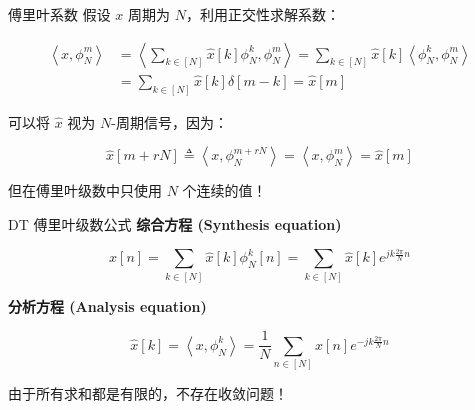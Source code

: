 \documentclass[
  ignorenonframetext,
]{beamer}
\begin{document}
\begin{frame}{傅里叶系数}
\protect{}\label{ux5085ux91ccux53f6ux7cfbux6570}
假设 \(x\) 周期为 \(N\)，利用正交性求解系数：

\[
\begin{aligned}
\left\langle x, \phi_{N}^{m}\right\rangle & =\left\langle\sum_{k \in[N]} \hat{x}[k] \phi_{N}^{k}, \phi_{N}^{m}\right\rangle=\sum_{k \in[N]} \hat{x}[k]\left\langle\phi_{N}^{k}, \phi_{N}^{m}\right\rangle \\
& =\sum_{k \in[N]} \hat{x}[k] \delta[m-k]=\hat{x}[m]
\end{aligned}
\]

可以将 \(\hat{x}\) 视为 \(N\)-周期信号，因为：

\[
\hat{x}[m+r N] \triangleq\left\langle x, \phi_{N}^{m+r N}\right\rangle=\left\langle x, \phi_{N}^{m}\right\rangle=\hat{x}[m]
\]

但在傅里叶级数中只使用 \(N\) 个连续的值！
\end{frame}

\begin{frame}{DT 傅里叶级数公式}
\protect{}\label{dt-ux5085ux91ccux53f6ux7ea7ux6570ux516cux5f0f}
\textbf{综合方程 (Synthesis equation)}

\[
x[n]=\sum_{k \in[N]} \hat{x}[k] \phi_{N}^{k}[n]=\sum_{k \in[N]} \hat{x}[k] e^{j k \frac{2 \pi}{N} n}
\]

\textbf{分析方程 (Analysis equation)}

\[
\hat{x}[k]=\left\langle x, \phi_{N}^{k}\right\rangle=\frac{1}{N} \sum_{n \in[N]} x[n] e^{-j k \frac{2 \pi}{N} n}
\]

由于所有求和都是有限的，不存在收敛问题！
\end{frame}
\end{document}
